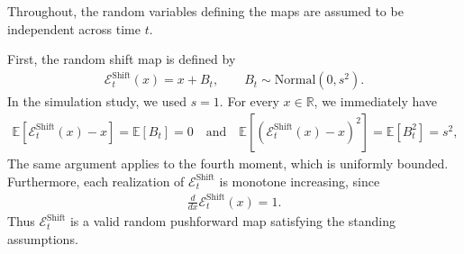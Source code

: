 \documentclass[a4paper, 11pt]{article}
\newcommand{\R}{\mathbb{R}}
\newcommand{\E}{\mathbb E}
\newcommand{\T}{\mathcal E}
\theoremstyle{definition}
\begin{document}
Throughout, the random variables defining the maps are assumed to be independent across time $t$.

First, the random shift map is defined by
\begin{align}
    \T_t^{\mathrm{Shift}}(x)=x+B_t, \qquad B_t \sim \mathrm{Normal}(0,s^2) .
\end{align}
In the simulation study, we used $s=1$.
For every $x\in\R$, we immediately have
\begin{align}
    \E\left[ \T_t^{\mathrm{Shift}}(x)-x \right] = \E[ B_t ] = 0 \quad \text{and} \quad \E\left[\left( \T_t^{\mathrm{Shift}}(x)-x \right)^2 \right] = \E[ B_t^2 ] = s^2,
\end{align}
The same argument applies to the fourth moment, which is uniformly bounded.
Furthermore, each realization of $\T_t^{\mathrm{Shift}}$ is monotone increasing, since
\begin{align}
    \frac{d}{dx}\T_t^{\mathrm{Shift}}(x)=1.
\end{align}
Thus $\T_t^{\mathrm{Shift}}$ is a valid random pushforward map satisfying the standing assumptions.
\end{document}
